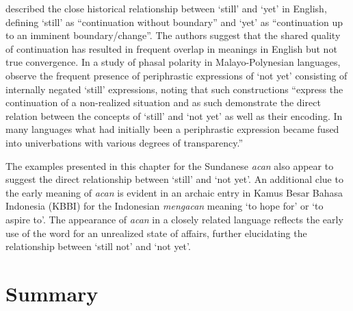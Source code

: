 \documentclass[output=paper]{langscibook}
\begin{document}
\citet[170]{KönigTraugott1982} described the close historical relationship between ‘still’ and ‘yet’ in English, defining ‘still’ as “continuation without boundary” and ‘yet’ as “continuation up to an imminent boundary/change”. The authors suggest that the shared quality of continuation has resulted in frequent overlap in meanings in English but not true convergence. In a study of phasal polarity in Malayo-Polynesian languages, \citet[15]{VeselinovaEtAlFC} observe the frequent presence of periphrastic expressions of ‘not yet’ consisting of internally negated ‘still’ expressions, noting that such constructions “express the continuation of a non-realized situation and as such demonstrate the direct relation between the concepts of ‘{still}’ and ‘{not yet}’ as well as their encoding. In many languages what had initially been a periphrastic expression became fused into univerbations with various degrees of transparency.”

The examples presented in this chapter for the Sundanese \textit{acan} also appear to suggest the direct relationship between ‘{still}’ and ‘{not yet}’. An additional clue to the early meaning of \textit{acan} is evident in an archaic entry in Kamus Besar Bahasa Indonesia (KBBI) for the Indonesian \textit{mengacan} meaning ‘to hope for’ or ‘to aspire to’. The appearance of \textit{acan} in a closely related language reflects the early use of the word for an unrealized state of affairs, further elucidating the relationship between ‘still not’ and ‘not yet’. 

\section{Summary}\label{sec:sun:5}
\end{document}
